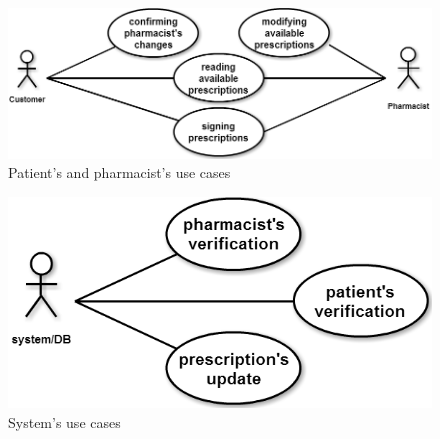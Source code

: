 \begin{figure}[h]
    \centering
    \includegraphics[width=0.75\textheight]{use-case-2.png}
    \caption{Patient's and pharmacist's use cases}
    \label{fig:usecase}
\end{figure} 

\begin{figure}[h]
    \centering
    \includegraphics[width=0.45\textheight]{use-case-1.png}
    \caption{System's use cases}
    \label{fig:usecase}
\end{figure} 


\newpage
\section{}

